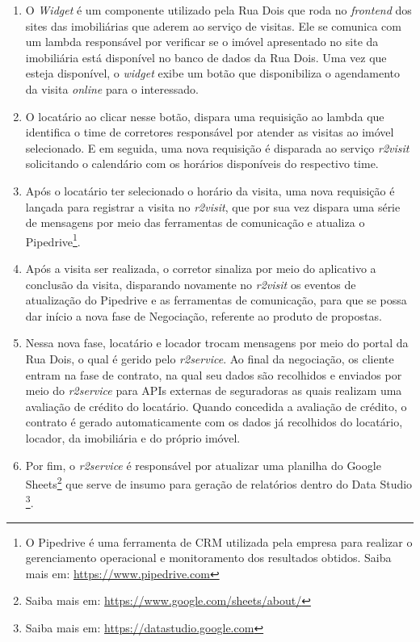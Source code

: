   \begin{enumerate}
    \item O \textit{Widget} é um componente utilizado pela Rua Dois que roda
      no \textit{frontend} dos sites das imobiliárias que aderem ao serviço
      de visitas. Ele se comunica com um lambda responsável por verificar se
      o imóvel apresentado no site da imobiliária está disponível no banco
      de dados da Rua Dois. Uma vez que esteja disponível, o \textit{widget}
      exibe um botão que disponibiliza o agendamento da visita \textit{online}
      para o interessado.
    \item O locatário ao clicar nesse botão, dispara uma requisição ao lambda
    que identifica o time de corretores responsável por atender as visitas
    ao imóvel selecionado. E em seguida, uma nova requisição é disparada ao
    serviço \textit{r2visit} solicitando o calendário com os horários
    disponíveis do respectivo time.
    \item Após o locatário ter selecionado o horário da visita, uma nova
    requisição é lançada para registrar a visita no \textit{r2visit}, que por
    sua vez dispara uma série de mensagens por meio das ferramentas de comunicação
    e atualiza o Pipedrive\footnote{O Pipedrive é uma ferramenta de \gls{CRM} utilizada pela
    empresa para realizar o gerenciamento operacional e monitoramento dos resultados obtidos.
    Saiba mais em: \url{https://www.pipedrive.com}}.
    \item Após a visita ser realizada, o corretor sinaliza por meio do aplicativo
    a conclusão da visita, disparando novamente no \textit{r2visit} os eventos
    de atualização do Pipedrive e as ferramentas de comunicação, para que se
    possa dar início a nova fase de Negociação, referente ao produto de propostas.
    \item Nessa nova fase, locatário e locador trocam mensagens por meio do portal
    da Rua Dois, o qual é gerido pelo \textit{r2service}. Ao final da negociação,
    os cliente entram na fase de contrato, na qual seu dados são recolhidos e
    enviados por meio do \textit{r2service} para \glspl{API} externas de seguradoras as quais
    realizam uma avaliação de crédito do locatário. Quando concedida a avaliação
    de crédito, o contrato é gerado automaticamente com os dados já recolhidos
    do locatário, locador, da imobiliária e do próprio imóvel.
    \item Por fim, o \textit{r2service} é responsável por atualizar uma planilha do
    Google Sheets\footnote{Saiba mais em: \url{https://www.google.com/sheets/about/}}
    que serve de insumo para geração de relatórios dentro do Data Studio
    \footnote{Saiba mais em: \url{https://datastudio.google.com}}.
  \end{enumerate}

